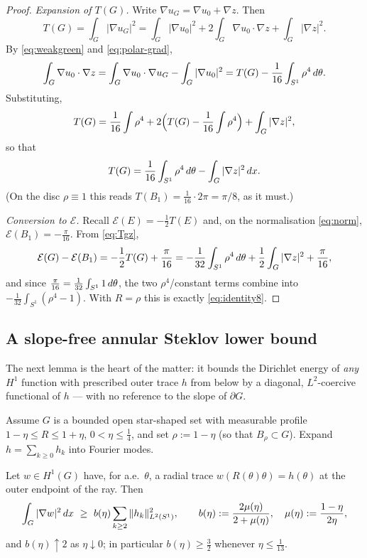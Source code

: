 \begin{proof}
\emph{Expansion of $T(G)$.}
Write $\nabla u_G=\nabla u_0+\nabla z$. Then
\[
   T(G)=\int_G|\nabla u_G|^2
   =\int_G|\nabla u_0|^2+2\int_G\nabla u_0\cdot\nabla z+\int_G|\nabla z|^2 .
\]
By \eqref{eq:weakgreen} and \eqref{eq:polar-grad},
\[
   \int_G\nabla u_0\cdot\nabla z
   =\int_G\nabla u_0\cdot\nabla u_G-\int_G|\nabla u_0|^2
   =T(G)-\frac1{16}\int_{S^1}\rho^4\,d\theta .
\]
Substituting,
\[
   T(G)=\frac1{16}\int\rho^4
   +2\Bigl(T(G)-\frac1{16}\int\rho^4\Bigr)+\int_G|\nabla z|^2,
\]
so that
\begin{equation}\label{eq:Tgz}
   T(G)=\frac1{16}\int_{S^1}\rho^4\,d\theta-\int_G|\nabla z|^2\,d x .
\end{equation}
(On the disc $\rho\equiv1$ this reads $T(B_1)=\tfrac1{16}\cdot2\pi=\pi/8$,
as it must.)

\emph{Conversion to $\mathcal E$.}
Recall $\mathcal E(E)=-\tfrac12 T(E)$ and, on the normalisation
\eqref{eq:norm}, $\mathcal E(B_1)=-\tfrac\pi{16}$. From \eqref{eq:Tgz},
\[
   \mathcal E(G)-\mathcal E(B_1)
   =-\frac12 T(G)+\frac\pi{16}
   =-\frac1{32}\int_{S^1}\rho^4\,d\theta+\frac12\int_G|\nabla z|^2
     +\frac\pi{16},
\]
and since $\tfrac\pi{16}=\tfrac1{32}\int_{S^1}1\,d\theta$, the two
$\rho^4$/constant terms combine into $-\tfrac1{32}\int_{S^1}(\rho^4-1)$.
With $R=\rho$ this is exactly \eqref{eq:identity8}.
\end{proof}

\subsection{A slope-free annular Steklov lower bound}

The next lemma is the heart of the matter: it bounds the Dirichlet energy of
\emph{any} $H^1$ function with prescribed outer trace $h$ from below by a
diagonal, $L^2$-coercive functional of $h$ --- with no reference to the
slope of $\partial G$.

Assume $G$ is a bounded open star-shaped set with measurable profile
$1-\eta\le R\le1+\eta$, $0<\eta\le\tfrac14$, and set $\rho:=1-\eta$ (so that
$B_\rho\subset G$). Expand $h=\sum_{k\ge0}h_k$ into Fourier modes.

\begin{lemma}\label{lem:annular}
Let $w\in H^1(G)$ have, for a.e.\ $\theta$, a radial trace
$w(R(\theta)\theta)=h(\theta)$ at the outer endpoint of the ray. Then
\begin{equation}\label{eq:annular}
   \int_G|\nabla w|^2\,d x\ \ge\ b(\eta)\sum_{k\ge2}\|h_k\|_{L^2(S^1)}^2,
   \qquad
   b(\eta):=\frac{2\mu(\eta)}{2+\mu(\eta)},\quad \mu(\eta):=\frac{1-\eta}{2\eta},
\end{equation}
and $b(\eta)\uparrow2$ as $\eta\downarrow0$; in particular $b(\eta)\ge\tfrac32$
whenever $\eta\le\tfrac1{13}$.
\end{lemma}

